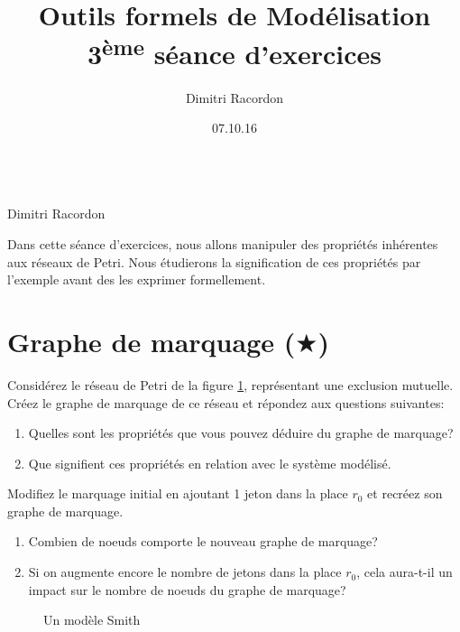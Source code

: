 \documentclass[a4paper, titlepage]{article}
\makeatletter
\numberwithin{figure}{section}
\numberwithin{table}{section}
\newcommand\objective[1]{\def\@objective{#1}}
\newcommand{\makecustomtitle}{%
	\begin{center}
		\huge\@title \\
		[1ex]\small Dimitri Racordon \\ \@date
	\end{center}
	\@objective
}
\makeatother
\begin{document}
  \title{Outils formels de Modélisation \\ 3\textsuperscript{ème} séance d'exercices}
  \author{Dimitri Racordon}
  \date{07.10.16}
  \objective{
    Dans cette séance d'exercices,
    nous allons manipuler des propriétés inhérentes aux réseaux de Petri.
    Nous étudierons la signification de ces propriétés par l'exemple
    avant des les exprimer formellement.
  }

	\makecustomtitle

  \section{Graphe de marquage ($\bigstar$)}
		Considérez le réseau de Petri de la figure \ref{fig:exclusion},
    représentant une exclusion mutuelle.
    Créez le graphe de marquage de ce réseau et répondez aux questions suivantes:
		\begin{enumerate}
			\item Quelles sont les propriétés que vous pouvez déduire du graphe de marquage?
			\item Que signifient ces propriétés en relation avec le système modélisé.
		\end{enumerate}

		Modifiez le marquage initial en ajoutant 1 jeton dans la place $r_0$
    et recréez son graphe de marquage.

		\begin{enumerate}
			\item Combien de noeuds comporte le nouveau graphe de marquage?
			\item Si on augmente encore le nombre de jetons dans la place $r_0$,
            cela aura-t-il un impact sur le nombre de noeuds du graphe de marquage?
		\end{enumerate}

		\begin{figure}[ht]
			\centering
			\caption{Un modèle Smith}
			\label{fig:exclusion}
		\end{figure}
\end{document}
